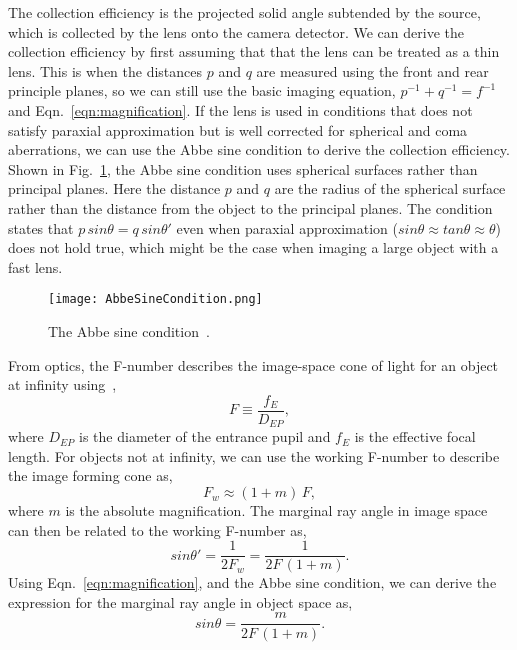 The collection efficiency is the projected solid angle subtended by the source, which is collected by the lens onto the camera detector.  We can derive the collection efficiency by first assuming that that the lens can be treated as a thin lens.  This is when the distances $p$ and $q$ are measured using the front and rear principle planes, so we can still use the basic imaging equation, $p^{-1} + q^{-1} = f^{-1}$ and Eqn.~\ref{eqn:magnification}.  If the lens is used in conditions that does not satisfy paraxial approximation but is well corrected for spherical and coma aberrations, we can use the Abbe sine condition to derive the collection efficiency.  Shown in Fig.~\ref{fig:Abbe}, the Abbe sine condition uses spherical surfaces rather than principal planes.  Here the distance $p$ and $q$ are the radius of the spherical surface rather than the distance from the object to the principal planes.  The condition states that $p \, sin \theta = q \, sin \theta'$ even when paraxial approximation ($sin \theta \approx tan \theta \approx \theta $) does not hold true, which might be the case when imaging a large object with a fast lens.
%
\begin{figure}[h]
\texttt{[image: AbbeSineCondition.png]}
\caption{The Abbe sine condition~\citep{Barrett2004}.}
\label{fig:Abbe}
\end{figure}

From optics, the F-number describes the image-space cone of light for an object at infinity using~\citep{greivenkampfieldguide},
%
\begin{equation}
F \equiv \frac{f_E}{D_{EP}},
\end{equation}
%
where $D_{EP}$ is the diameter of the entrance pupil and $f_E$ is the effective focal length.  For objects not at infinity, we can use the working F-number to describe the image forming cone as,
%
\begin{equation}
F_{w} \approx (1 + m) \, F,
\end{equation}
%
where $m$ is the absolute magnification.  The marginal ray angle in image space can then be related to the working F-number as,
%
\begin{equation}
sin \theta' = \frac{1}{2 F_{w}} = \frac{1}{2 F \, (1+m)}.
\end{equation}
%
Using Eqn.~\ref{eqn:magnification}, and the Abbe sine condition, we can derive the expression for the marginal ray angle in object space as,
%
\begin{equation}
sin \theta = \frac{m}{2 F \, (1+m)}.
\label{eqn:marginal_ray_angle}
\end{equation}

